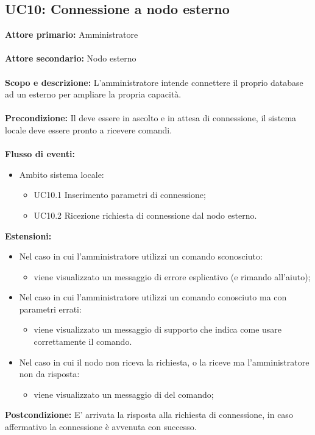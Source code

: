 \documentclass{scalatekids-article}
\begin{document}
\subsection{UC10: Connessione a nodo esterno}
\textbf{Attore primario:} Amministratore \\ \\
\textbf{Attore secondario:} Nodo esterno \\ \\
\textbf{Scopo e descrizione:} L'amministratore intende connettere il proprio database ad un  esterno per ampliare la propria capacità.\\ \\
\textbf{Precondizione:} Il  deve essere in ascolto e in attesa di connessione, il sistema locale deve essere pronto a ricevere comandi.\\ \\
\textbf{Flusso di eventi:}
\begin{itemize}
\item Ambito sistema locale:
  \begin{itemize}
  \item UC10.1 Inserimento parametri di connessione;
  \end{itemize}
  \begin{itemize}
  \item UC10.2 Ricezione richiesta di connessione dal nodo esterno.
  \end{itemize}
\end{itemize}
\textbf{Estensioni:}
\begin{itemize}
\item Nel caso in cui l'amministratore utilizzi un comando sconosciuto:
  \begin{itemize}
  \item viene visualizzato un messaggio di errore esplicativo (e rimando all'aiuto);
  \end{itemize}
\item Nel caso in cui l'amministratore utilizzi un comando conosciuto ma con parametri errati:
  \begin{itemize}
  \item viene visualizzato un messaggio di supporto che indica come usare correttamente il comando.
  \end{itemize}
\item Nel caso in cui il nodo non riceva la richiesta, o la riceve ma l'amministratore non da risposta:
  \begin{itemize}
  \item viene visualizzato un messaggio di  del comando;
  \end{itemize}
\end{itemize}
\textbf{Postcondizione:} E' arrivata la risposta alla richiesta di connessione, in caso affermativo la connessione è avvenuta con successo.
\end{document}
